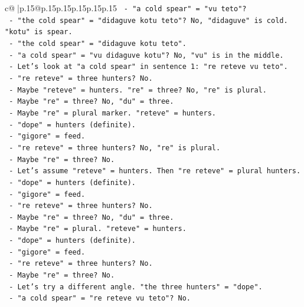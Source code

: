 \documentclass{article}
\begin{document}
{\begin{supertabular}{c@{$\;$}|p{.15\linewidth}@{}p{.15\linewidth}p{.15\linewidth}p{.15\linewidth}p{.15\linewidth}p{.15\linewidth}}
{{{\texttt{         {-} "a cold spear" = "vu teto"?} \\
\texttt{         {-} "the cold spear" = "didaguve kotu teto"? No, "didaguve" is cold. "kotu" is spear.} \\
\texttt{         {-} "the cold spear" = "didaguve kotu teto".} \\
\texttt{         {-} "a cold spear" = "vu didaguve kotu"? No, "vu" is in the middle.} \\
\texttt{         {-} Let's look at "a cold spear" in sentence 1: "re reteve vu teto".} \\
\texttt{           {-} "re reteve" = three hunters? No.} \\
\texttt{           {-} Maybe "reteve" = hunters. "re" = three? No, "re" is plural.} \\
\texttt{           {-} Maybe "re" = three? No, "du" = three.} \\
\texttt{           {-} Maybe "re" = plural marker. "reteve" = hunters.} \\
\texttt{           {-} "dope" = hunters (definite).} \\
\texttt{           {-} "gigore" = feed.} \\
\texttt{           {-} "re reteve" = three hunters? No, "re" is plural.} \\
\texttt{           {-} Maybe "re" = three? No.} \\
\texttt{           {-} Let's assume "reteve" = hunters. Then "re reteve" = plural hunters.} \\
\texttt{           {-} "dope" = hunters (definite).} \\
\texttt{           {-} "gigore" = feed.} \\
\texttt{           {-} "re reteve" = three hunters? No.} \\
\texttt{           {-} Maybe "re" = three? No, "du" = three.} \\
\texttt{           {-} Maybe "re" = plural. "reteve" = hunters.} \\
\texttt{           {-} "dope" = hunters (definite).} \\
\texttt{           {-} "gigore" = feed.} \\
\texttt{           {-} "re reteve" = three hunters? No.} \\
\texttt{           {-} Maybe "re" = three? No.} \\
\texttt{           {-} Let's try a different angle. "the three hunters" = "dope".} \\
\texttt{           {-} "a cold spear" = "re reteve vu teto"? No.} \\
}}}
\end{supertabular}}
\end{document}
